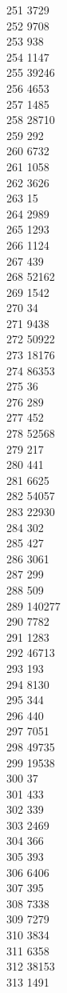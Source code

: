 { 251	3729 \\
 252	9708 \\
 253	938 \\
 254	1147 \\
 255	39246 \\
 256	4653 \\
 257	1485 \\
 258	28710 \\
 259	292 \\
 260	6732 \\
 261	1058 \\
 262	3626 \\
 263	15 \\
 264	2989 \\
 265	1293 \\
 266	1124 \\
 267	439 \\
 268	52162 \\
 269	1542 \\
 270	34 \\
 271	9438 \\
 272	50922 \\
 273	18176 \\
 274	86353 \\
 275	36 \\
 276	289 \\
 277	452 \\
 278	52568 \\
 279	217 \\
 280	441 \\
 281	6625 \\
 282	54057 \\
 283	22930 \\
 284	302 \\
 285	427 \\
 286	3061 \\
 287	299 \\
 288	509 \\
 289	140277 \\
 290	7782 \\
 291	1283 \\
 292	46713 \\
 293	193 \\
 294	8130 \\
 295	344 \\
 296	440 \\
 297	7051 \\
 298	49735 \\
 299	19538 \\
 300	37 \\
 301	433 \\
 302	339 \\
 303	2469 \\
 304	366 \\
 305	393 \\
 306	6406 \\
 307	395 \\
 308	7338 \\
 309	7279 \\
 310	3834 \\
 311	6358 \\
 312	38153 \\
 313	1491 \\
}
